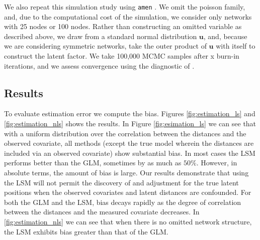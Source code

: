 \documentclass[11pt]{article}
\begin{document}
We also repeat this simulation study using \texttt{amen} \citep{hoff2015dyadic, minhas2016inferential}. We omit the poisson family, and, due to the computational cost of the simulation, we consider only networks with 25 nodes or 100 nodes. Rather than constructing an omitted variable as described above, we draw from a standard normal distribution $\mathbf{u}$, and, because we are considering symmetric networks, take the outer product of $\mathbf{u}$ with itself to construct the latent factor. We take 100,000 MCMC samples after x burn-in iterations, and we assess convergence using the diagnostic of \cite{raftery1992practical}.

\subsection{Results}

To evaluate estimation error we compute the bias. Figures \ref{fig:estimation_ls} and \ref{fig:estimation_nls} shows the results. In Figure \ref{fig:esimation_ls} we can see that with a uniform distribution over the correlation between the distances and the observed covariate, all methods (except the true model wherein the distances are included via an observed covariate) show substantial bias. In most cases the LSM performs better than the GLM, sometimes by as much as $50\%$. However, in absolute terms, the amount of bias is large. Our results demonstrate that using the LSM will not permit the discovery of and adjustment for the true latent positions when the observed covariates and latent distances are confounded.  For both the GLM and the LSM, bias decays rapidly as the degree of correlation between the distances and the measured covariate decreases. In \ref{fig:estimation_nls} we can see that when there is no omitted network structure, the LSM exhibits bias greater than that of the GLM.
\end{document}
